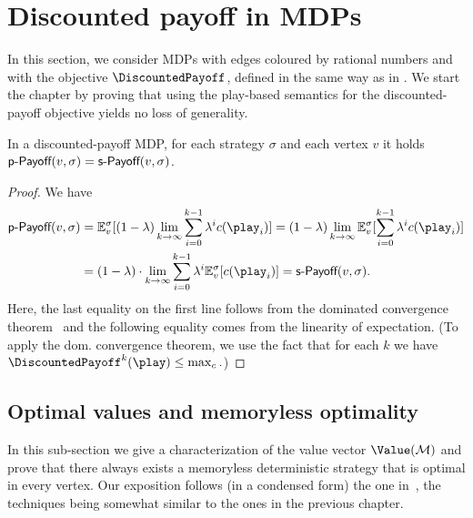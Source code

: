\section{Discounted payoff in MDPs}

In this section, we consider MDPs with edges coloured by rational numbers 
and with the objective $\DiscountedPayoff$, defined in the same way as in 
. We start the chapter by proving that using the play-based semantics for the discounted-payoff objective yields no loss of generality. 

\begin{lemma}
	\label{5-lem:disc-step-one}
In a discounted-payoff MDP, for each strategy $ \sigma $ and each vertex $ v $ it holds $ \textsf{p-Payoff}(v, \sigma) = \textsf{s-Payoff}(v, \sigma) $.
\end{lemma}
\begin{proof}
We have 
\begin{align*} \playPay(v,\sigma) &= \expv^\sigma_v[(1-\lambda)\lim_{k \rightarrow \infty} \sum_{i=0}^{k-1}\lambda^i \colouring(\play_i) ] = (1-\lambda) \lim_{k \rightarrow \infty} \expv^\sigma_v[\sum_{i=0}^{k-1}\lambda^i \colouring(\play_i) ] 
\\
&= (1-\lambda)\cdot\lim_{k \rightarrow \infty} \sum_{i=0}^{k-1}\lambda^i\expv^\sigma_v[ \colouring(\play_i) ] = \stepPay(v, \sigma).
\end{align*}
%
Here, the last equality on the first line follows from the dominated convergence theorem~\cite[Theorem 1.6.9]{Ash&Doleans-Dade:2000} and the following equality comes from the linearity of expectation. (To apply the dom. convergence 
theorem, we use the fact that for each 
$k$ we have $\DiscountedPayoff^{k}(\play)\leq \maxc.
$)
\end{proof}

\subsection*{Optimal values and memoryless optimality}

 In this sub-section we give a 
characterization of the value vector $\Value(\mdp)$ and prove that there always exists a 
memoryless deterministic strategy that is optimal in every vertex. Our 
exposition follows (in a condensed form) the one in~\cite{Puterman:2005}, the techniques 
being somewhat similar to the ones in the previous chapter.

%

